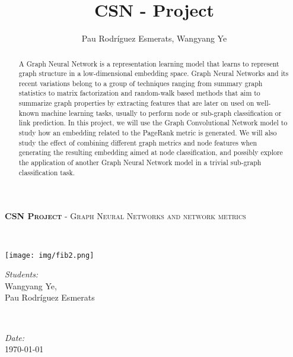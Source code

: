 \documentclass[a4paper]{article}
\title{CSN - Project}
\author{Pau Rodríguez Esmerats, Wangyang Ye }
\begin{document}
%



\begin{minipage}{0.6\textwidth}
\begin{flushleft} \large
\textsc{\textbf{\Large CSN Project}} -  \textsc{\large Graph Neural Networks and network metrics }\\[0.5cm] %
\end{flushleft}
\end{minipage}
~
\begin{minipage}{0.4\textwidth}
\begin{flushright} \large
\texttt{[image: img/fib2.png]}\\[0.3cm]
\end{flushright}
\end{minipage}
 


\begin{minipage}{0.7\textwidth}
\begin{flushleft} 
\emph{Students:}\\
Wangyang Ye,\\ Pau Rodríguez Esmerats  %
\end{flushleft}
\end{minipage}
~
\begin{minipage}{0.3\textwidth}
\begin{flushleft}
\emph{Date:}\\
\today
\end{flushleft}
\end{minipage}\\[0.5cm]

\begin{abstract}
A Graph Neural Network is a representation learning model that learns to represent graph structure in a low-dimensional embedding space.
Graph Neural Networks and its recent variations belong to a group of techniques ranging from summary graph statistics to matrix factorization and random-walk based methods that aim to summarize graph properties by extracting features that are later on used on well-known machine learning tasks, usually to perform node or sub-graph classification or link prediction.
In this project, we will use the Graph Convolutional Network model to study how an embedding related to the PageRank metric is generated. We will also study the effect of combining different graph metrics and node features when generating the resulting embedding aimed at node classification, and possibly explore the application of another Graph Neural Network model in a trivial sub-graph classification task.

\end{abstract}
\end{document}
